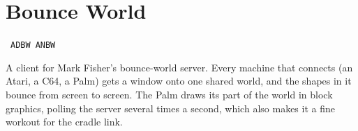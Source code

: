 \newpage
\section{Bounce World}\label{app:bounce}
  {\fnbadge\ \texttt{ADBW}\qquad \fibadge\ \texttt{ANBW}}

A client for Mark Fisher's \textsf{bounce-world} server. Every machine that
connects (an Atari, a C64, a Palm) gets a window onto one shared world, and
the shapes in it bounce from screen to screen. The Palm draws its part of the
world in block graphics, polling the server several times a second, which
also makes it a fine workout for the cradle link.

\begin{center}
\hfill
{}\hfill
{}
\end{center}

